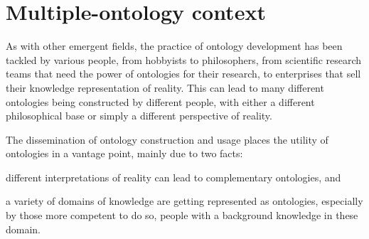 

\section{Multiple-ontology context} \label{sec:concepts/multi-ontology}

As with other emergent fields, the practice of ontology development has been tackled by various people, from hobbyists to philosophers, from scientific research teams that need the power of ontologies for their research, to enterprises that sell their knowledge representation of reality. This can lead to many different ontologies being constructed by different people, with either a different philosophical base or simply a different perspective of reality.

The dissemination of ontology construction and usage places the utility of ontologies in a vantage point, mainly due to two facts:
\begin{paralist}
    \item different interpretations of reality can lead to complementary ontologies, and
    \item a variety of domains of knowledge are getting represented as ontologies, especially by those more competent to do so, \ie people with a background knowledge in these domain.
\end{paralist}

